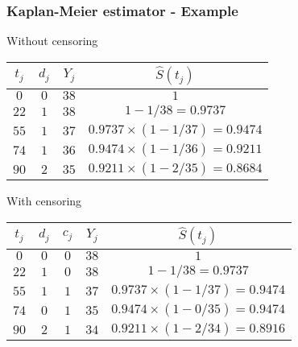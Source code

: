 \documentclass[11pt, aspectratio = 169]{beamer}
\begin{document}
\begin{frame}
  \frametitle{Kaplan-Meier estimator - Example}
  \begin{block}{Without censoring}
    \begin{center}\begin{footnotesize}
      \begin{tabular}{c c c c}
        $t_j$ & $d_j$ & $Y_j$ & $\hat{S}(t_j)$ \\\hline
        $0$ & $0$ & $38$ & $1$ \\
        $22$ & $1$ & $38$ & $1 - 1/38 = 0.9737$ \\
        $55$ & $1$ & $37$ & $0.9737 \times (1 - 1/37) = 0.9474$ \\
        $74$ & $1$ & $36$ & $0.9474 \times (1 - 1/36) = 0.9211$ \\
        $90$ & $2$ & $35$ & $0.9211 \times (1 - 2/35) = 0.8684$
      \end{tabular}
    \end{footnotesize}\end{center}
  \end{block}
  \begin{block}{With censoring}
    \begin{center}\begin{footnotesize}
      \begin{tabular}{c c c c c}
        $t_j$ & $d_j$ & $c_j$ & $Y_j$ & $\hat{S}(t_j)$ \\\hline
        $0$ & $0$ & $0$ & $38$ & $1$ \\
        $22$ & $1$ & $0$ & $38$ & $1 - 1/38 = 0.9737$ \\
        $55$ & $1$ & $1$ & $37$ & $0.9737 \times (1 - 1/37) = 0.9474$ \\
        $74$ & $0$ & $1$ & $35$ & $0.9474 \times (1 - 0/35) = 0.9474$ \\
        $90$ & $2$ & $1$ & $34$ & $0.9211 \times (1 - 2/34) = 0.8916$
      \end{tabular}
    \end{footnotesize}\end{center}
  \end{block}
\end{frame}
\end{document}
